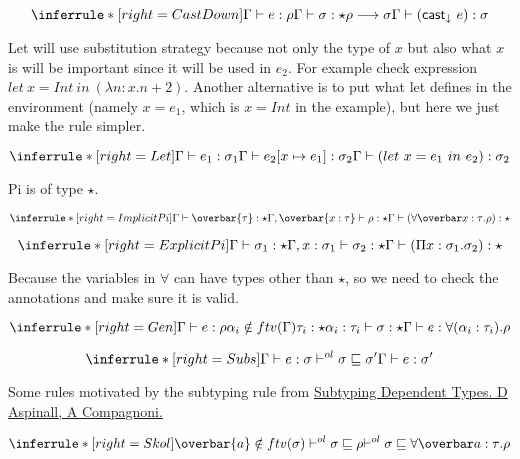 \[
\inferrule*[right=CastDown]
{\judge e : \rho \\ \judge \sigma : \star \\ \rho \longrightarrow \sigma} {\judge (\mathsf{cast}_\downarrow\ e) : \sigma}
\]

Let will use substitution strategy because not only the type of $x$ but also what $x$ is will be important since it will be used in $e_2$. For example check expression $let\ x = Int\ in\ (\lambda n:x.n + 2)$. Another alternative is to put what let defines in the environment (namely $x=e_1$, which is $x=Int$ in the example), but here we just make the rule simpler.

\[
\inferrule*[right=Let]
{\judge e_1 : \sigma_1 \\ \Gamma \vdash e_2[\tpmapsto {\sigma_1} x {e_1}]: \sigma_2} {\judge ( let\ x = e_1\ in\ e_2 ) : \sigma_2 }
\]

Pi is of type $\star$.

\[
\inferrule*[right=ImplicitPi]
{\judge \overbar{\tau} : \star \\ \Gamma, \overbar{x:\tau} \vdash \rho : \star} {\judge (\forallvars{x : \tau}. \rho) : \star}
\]

\[
\inferrule*[right=ExplicitPi]
{\judge \sigma_1 : \star \\ \Gamma, x:\sigma_1 \vdash \sigma_2 : \star} {\judge (\Pi x:\sigma_1. \sigma_2) : \star}
\]

Because the variables in $\forall$ can have types other than $\star$, so we need to check the annotations and make sure it is valid.

\[
\inferrule*[right=Gen]
{\judge e : \rho \\
\alpha_i \notin ftv(\Gamma) \\
\tau_i : \star \\
\alpha_i : \tau_i \vdash \sigma : \star}
{\judge e : \forall(\alpha_i : \tau_i). \rho }
\]

\[
\inferrule*[right=Subs]
{\judge e : \sigma \\ \olpolymorphic{\sigma} {\sigma'}} {\judge e : \sigma' }
\]


Some rules motivated by the subtyping rule from \href{http://citeseerx.ist.psu.edu/viewdoc/download?doi=10.1.1.52.5145&rep=rep1&type=pdf}{Subtyping Dependent Types. D Aspinall, A Compagnoni. }

\[
\inferrule*[right=Skol]
{
\overbar{a} \notin ftv(\sigma)\\
\olpolymorphic \sigma \rho \\
}
{\olpolymorphic \sigma {\forallvars{a:\tau}.\rho}}
\]

